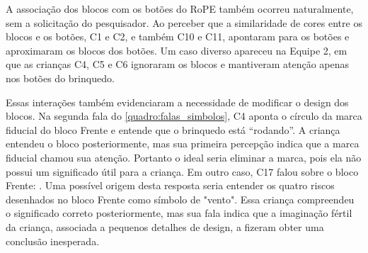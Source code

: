 A associação dos blocos com os botões do RoPE também ocorreu naturalmente, sem a solicitação do pesquisador. Ao perceber que a similaridade de cores entre os blocos e os botões, C1 e C2, e também C10 e C11, apontaram para os botões e aproximaram os blocos dos botões. Um caso diverso apareceu na Equipe 2, em que as crianças C4, C5 e C6 ignoraram os blocos e mantiveram atenção apenas nos botões do brinquedo.

Essas interações também evidenciaram a necessidade de modificar o design dos blocos. Na segunda fala do \autoref{quadro:falas_simbolos}, C4 aponta o círculo da marca fiducial do bloco Frente e entende que o brinquedo está “rodando”. A criança entendeu o bloco posteriormente, mas sua primeira percepção indica que a marca fiducial chamou sua atenção. Portanto o ideal seria eliminar a marca, pois ela não possui um significado útil para a criança. Em outro caso, C17 falou sobre o bloco Frente: . Uma possível origem desta resposta seria entender os quatro riscos desenhados no bloco Frente como símbolo de "vento". Essa criança compreendeu o significado correto posteriormente, mas sua fala indica que a imaginação fértil da criança, associada a pequenos detalhes de design, a fizeram obter uma conclusão inesperada.

